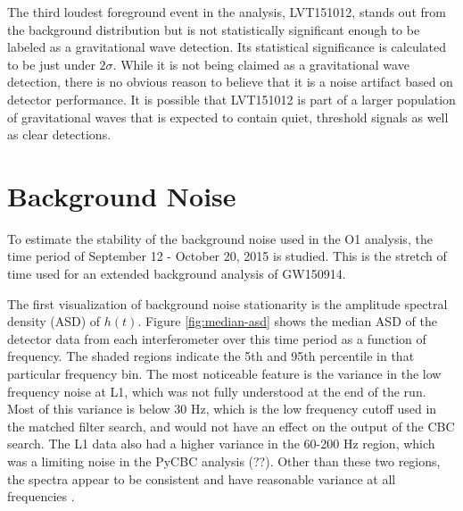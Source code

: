 The third loudest foreground event in the analysis, LVT151012, stands out 
from the background distribution but is not statistically significant 
enough to be labeled as a gravitational wave detection. Its statistical 
significance is calculated to be just under $2\sigma$. While it is not 
being claimed as a gravitational wave detection, there is no obvious 
reason to believe that it is a noise artifact based on detector 
performance. It is possible that LVT151012 is part of a larger 
population of gravitational waves that is expected to contain 
quiet, threshold signals as well as clear detections.

\section{Background Noise}

To estimate the stability of the background noise used in the O1 
analysis, the time period of September 12 - October 20, 2015 is 
studied. This is the stretch 
of time used for an extended background analysis of GW150914. 

The first 
visualization of background noise stationarity is the amplitude 
spectral density (ASD) of $h(t)$. Figure \ref{fig:median-asd} 
shows the 
median ASD of the detector data from each interferometer over this 
time period as a function of frequency. The shaded regions indicate 
the 5th and 95th percentile in that particular frequency bin. 
The most noticeable feature is the variance in the low frequency 
noise at L1, which was not fully understood at the end of the run. 
Most of this variance is below 30 Hz, which is the 
low frequency cutoff used in the matched filter search, and would 
not have an effect on the output of the CBC search. The L1 data 
also had a higher variance in the 60-200 Hz region, which was a 
limiting noise in the PyCBC analysis (??). Other than these two regions, 
the spectra appear to be consistent and have reasonable variance 
at all frequencies \cite{GW150914-DETCHAR}.

